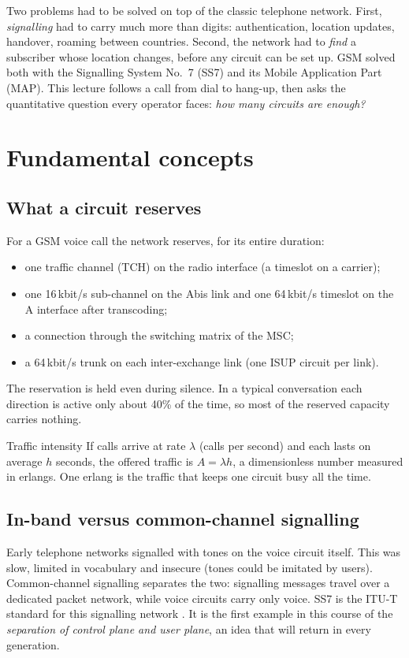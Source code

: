 \documentclass[11pt,a4paper]{article}
\begin{document}
Two problems had to be solved on top of the classic telephone network. First,
\emph{signalling} had to carry much more than digits: authentication, location updates,
handover, roaming between countries. Second, the network had to \emph{find} a subscriber
whose location changes, before any circuit can be set up. GSM solved both with the
Signalling System No.~7 (SS7) and its Mobile Application Part (MAP). This lecture follows
a call from dial to hang-up, then asks the quantitative question every operator faces:
\emph{how many circuits are enough?}

\section{Fundamental concepts}

\subsection{What a circuit reserves}
For a GSM voice call the network reserves, for its entire duration:
\begin{itemize}
  \item one traffic channel (TCH) on the radio interface (a timeslot on a carrier);
  \item one 16\,kbit/s sub-channel on the Abis link and one 64\,kbit/s timeslot on the A
        interface after transcoding;
  \item a connection through the switching matrix of the MSC;
  \item a 64\,kbit/s trunk on each inter-exchange link (one ISUP circuit per link).
\end{itemize}
The reservation is held even during silence. In a typical conversation each direction
is active only about 40\% of the time, so most of the reserved capacity carries nothing.

\begin{definitionbox}{Traffic intensity}
If calls arrive at rate $\lambda$ (calls per second) and each lasts on average $h$ seconds,
the offered traffic is $A = \lambda h$, a dimensionless number measured in erlangs. One
erlang is the traffic that keeps one circuit busy all the time.
\end{definitionbox}

\subsection{In-band versus common-channel signalling}
Early telephone networks signalled with tones on the voice circuit itself. This was slow,
limited in vocabulary and insecure (tones could be imitated by users). Common-channel
signalling separates the two: signalling messages travel over a dedicated packet network,
while voice circuits carry only voice. SS7 is the ITU-T standard for this signalling
network \cite{ituq700}. It is the first example in this course of the
\emph{separation of control plane and user plane}, an idea that will return in every
generation.
\end{document}
